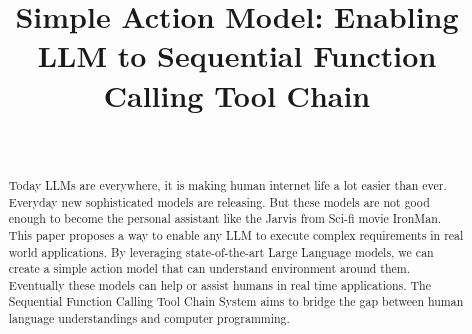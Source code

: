 \documentclass[conference]{IEEEtran}
\begin{document}
\title{Simple Action Model: Enabling LLM to Sequential Function Calling Tool Chain\\
}

\author{

{}

\\








}

\maketitle

\begin{abstract}
 Today LLMs are everywhere, it is making human internet life a lot easier than ever.
Everyday new sophisticated models are releasing. But these models are not good enough to become
the personal assistant like the Jarvis from Sci-fi movie IronMan. This paper proposes
a way to enable any LLM to execute complex requirements in real world applications. By
leveraging state-of-the-art Large Language models, we can create a simple action model that can 
understand environment around them. Eventually these models can help or assist humans in real time applications.
The Sequential Function Calling Tool Chain System
aims to bridge the gap between human language understandings and computer programming.
\end{abstract}
\end{document}
